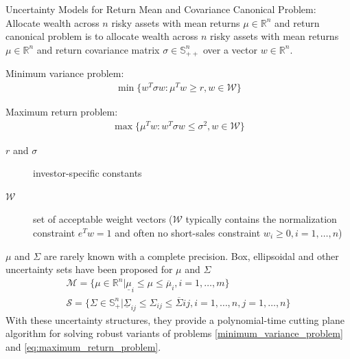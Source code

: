 \documentclass{beamer}
\begin{document}
\begin{frame}{Uncertainty Models for Return Mean and Covariance}
Canonical Problem:
Allocate wealth across $n$ risky assets with mean returns $\mu \in \mathbb{R}^n$ and return canonical problem is to allocate wealth across $n$ risky assets with mean returns $\mu \in \mathbb{R}^n$ and return covariance matrix $\sigma \in \mathbb{S}^{n}_{++}$ over a vector $w \in \mathbb{R}^n$.

Minimum variance problem:
\begin{align}
\label{eq:minimum_variance_problem}
\min \{w^T\sigma w : \mu^Tw \geq r, w \in \mathcal{W}\}
\end{align}

Maximum return problem:
\begin{align}
\label{eq:maximum_return_problem}
\max \{\mu^Tw : w^T\sigma w \leq \sigma^{2}, w \in \mathcal{W}\}
\end{align}

\begin{description}
\item [$r$ and $\sigma$] investor-specific constants
\item [$\mathcal{W}$] set of acceptable weight vectors ($\mathcal{W}$ typically contains the normalization constraint $e^{T}w = 1$ and often no short-sales constraint $w_{i} \geq 0, i=1,\dots,n$)
\end{description}
\end{frame}

\begin{frame}{}
$\mu$ and $\Sigma$ are rarely known with a complete precision.
Box, ellipsoidal and other uncertainty sets have been proposed for $\mu$ and $\Sigma$
\begin{align*}
\mathcal{M} = \{\mu \in \mathbb{R}^{n} | \underline{\mu}_{i} \leq \mu \leq \overline{\mu}_{i}, i = 1,\dots,m\} \\
\mathcal{S} = \{\Sigma \in \mathbb{S}_{+}^{n} | \underline{\Sigma}_{ij} \leq \Sigma_{ij} \leq \overline{\Sigma}{ij}, i=1,\dots,n, j=1,\dots,n\}
\end{align*}
With these uncertainty structures, they provide a polynomial-time cutting plane algorithm for solving robust variants of problems \ref{minimum_variance_problem} and \ref{eq:maximum_return_problem}.
\end{frame}
\end{document}
